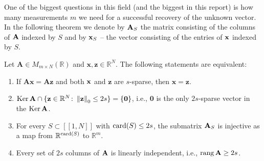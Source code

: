 One of the biggest questions in this field (and the biggest in this report) is how many measurements $m$ we need for a successful recovery of
the unknown vector.
In the following theorem we denote by $\mathbf{A}_S$ the matrix consisting of the columns of $\mathbf{A}$ indexed by $S$
and by $\mathbf{x}_S$ -- the vector consisting of the entries of $\mathbf{x}$ indexed by $S$.

\begin{theorem}
    Let $\mathbf{A} \in M_{m \times N}(\mathbb{R})$  and $\mathbf{x}, \mathbf{z} \in \mathbb{R}^N$.
    The following statements are equivalent:
    \begin{enumerate}[label=(\roman*)]
        \item \label{itm:itm1} If $\mathbf{Ax = Az}$ and both $\mathbf{x}$ and $\mathbf{z}$ are $s$-sparse, then $\mathbf{x = z}$.
        \item $\operatorname{Ker} \mathbf{A} \cap \{ \mathbf{z} \in \mathbb{R}^N \colon \left\Vert\mathbf{z}\right\Vert_0 \leq 2s \} = \{ \mathbf{0} \}$,
        i.e., $\mathbf{0}$ is the only $2s$-sparse vector in the $\operatorname{Ker} \mathbf{A}$.
        \item For every $S \subset [\![1,N]\!]$ with $\operatorname{card}(S) \leq 2s$, the submatrix $\mathbf{A}_S$ is injective as a
        map from $\mathbb{R}^{\operatorname{card}(S)}$ to $\mathbb{R}^m$.
        \item \label{itm:itm4} Every set of $2s$ columns of $\mathbf{A}$ is linearly independent, i.e., $\operatorname{rang} \mathbf{A} \geq 2s$.
    \end{enumerate}
\end{theorem}

